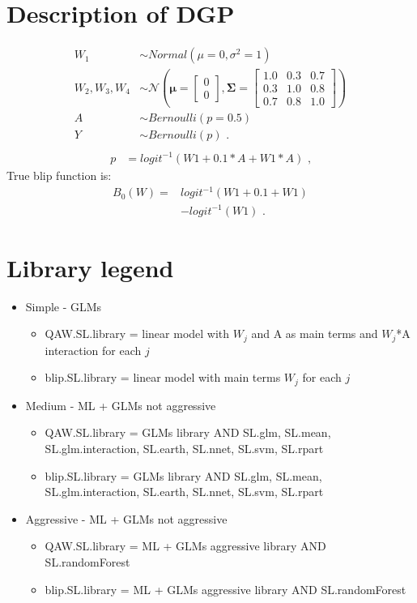 \documentclass[11pt]{article}\usepackage[]{graphicx}\usepackage[]{color}
\begin{document}
\section{Description of DGP}

\begin{align*}
W_1 &\sim Normal(\mu=0,\sigma^2=1) \\
W_2,W_3,W_4 &\sim \mathcal{N}(\bm{\mu} = \begin{bmatrix}
0\\
0
\end{bmatrix}, \bm{\Sigma} = \begin{bmatrix}
1.0 & 0.3 & 0.7\\
0.3 & 1.0 & 0.8\\
0.7 & 0.8 & 1.0
\end{bmatrix}) \\
A &\sim Bernoulli(p=0.5) \\
Y &\sim Bernoulli(p) \text{ .}\\
\end{align*}
\begin{align*}
p &= logit^{-1} (W1 + 0.1*A + W1*A) \text{ ,}
\end{align*}
True blip function is:
\begin{align*}
B_0 (W)= & logit^{-1} (W1 + 0.1 + W1)\\
& - logit^{-1} (W1) \text{ .}
\end{align*}

\section{Library legend}

\begin{itemize}
\item Simple - GLMs
\begin{itemize}
\item QAW.SL.library = linear model with $W_j$ and A as main terms and $W_j$*A interaction for each $j$
\item blip.SL.library = linear model with main terms $W_j$ for each $j$
\end{itemize}
\item Medium - ML + GLMs not aggressive
\begin{itemize}
\item QAW.SL.library = GLMs library AND SL.glm, SL.mean, SL.glm.interaction, SL.earth, SL.nnet, SL.svm, SL.rpart
\item blip.SL.library = GLMs library AND SL.glm, SL.mean, SL.glm.interaction, SL.earth, SL.nnet, SL.svm, SL.rpart
\end{itemize}
\item Aggressive - ML + GLMs not aggressive
\begin{itemize}
\item QAW.SL.library = ML + GLMs aggressive library AND SL.randomForest
\item blip.SL.library = ML + GLMs aggressive library AND SL.randomForest
\end{itemize}
\end{itemize}
\end{document}
